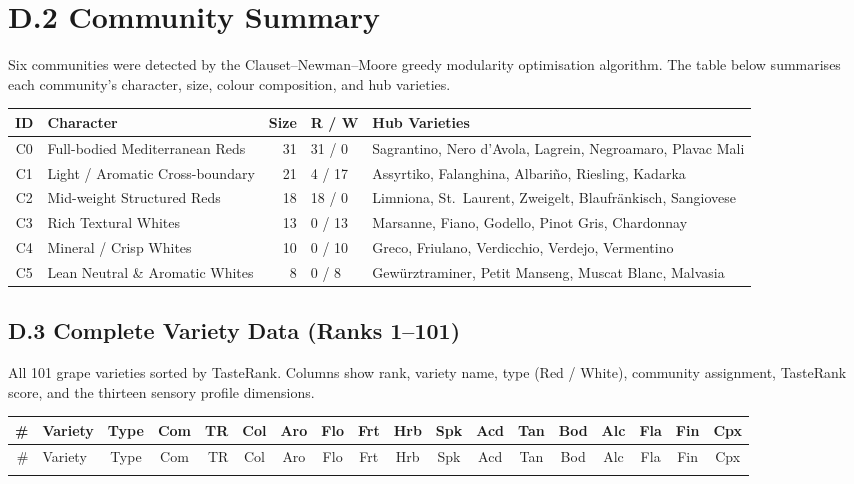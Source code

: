 \documentclass[11pt]{article}
\begin{document}
\section*{D.2 Community Summary}
Six communities were detected by the Clauset--Newman--Moore greedy modularity optimisation algorithm. The table below summarises each community's character, size, colour composition, and hub varieties.

\begin{center}
\begin{tabular}{@{}clrlp{6.5cm}@{}}
\toprule
ID & Character & Size & R / W & Hub Varieties \\
\midrule
C0 & Full-bodied Mediterranean Reds   & 31 & 31 / 0 & Sagrantino, Nero d'Avola, Lagrein, Negroamaro, Plavac Mali \\
C1 & Light / Aromatic Cross-boundary  & 21 & 4 / 17 & Assyrtiko, Falanghina, Albari\~no, Riesling, Kadarka \\
C2 & Mid-weight Structured Reds       & 18 & 18 / 0 & Limniona, St.\ Laurent, Zweigelt, Blaufr\"ankisch, Sangiovese \\
C3 & Rich Textural Whites             & 13 & 0 / 13 & Marsanne, Fiano, Godello, Pinot Gris, Chardonnay \\
C4 & Mineral / Crisp Whites           & 10 & 0 / 10 & Greco, Friulano, Verdicchio, Verdejo, Vermentino \\
C5 & Lean Neutral \& Aromatic Whites  &  8 & 0 / 8  & Gew\"urztraminer, Petit Manseng, Muscat Blanc, Malvasia \\
\bottomrule
\end{tabular}
\end{center}

\begin{landscape}
\section*{D.3 Complete Variety Data (Ranks 1--101)}
All 101 grape varieties sorted by TasteRank. Columns show rank, variety name, type (Red / White), community assignment, TasteRank score, and the thirteen sensory profile dimensions.

\renewcommand{\arraystretch}{1.05}
\small
\begin{longtable}{@{}r l c c r *{13}{c}@{}}
\toprule
\# & Variety & Type & Com & TR & Col & Aro & Flo & Frt & Hrb & Spk & Acd & Tan & Bod & Alc & Fla & Fin & Cpx \\
\midrule
\endfirsthead
\toprule
\# & Variety & Type & Com & TR & Col & Aro & Flo & Frt & Hrb & Spk & Acd & Tan & Bod & Alc & Fla & Fin & Cpx \\
\midrule
\endhead
\bottomrule
\endlastfoot

\end{longtable}
\end{landscape}
\end{document}
